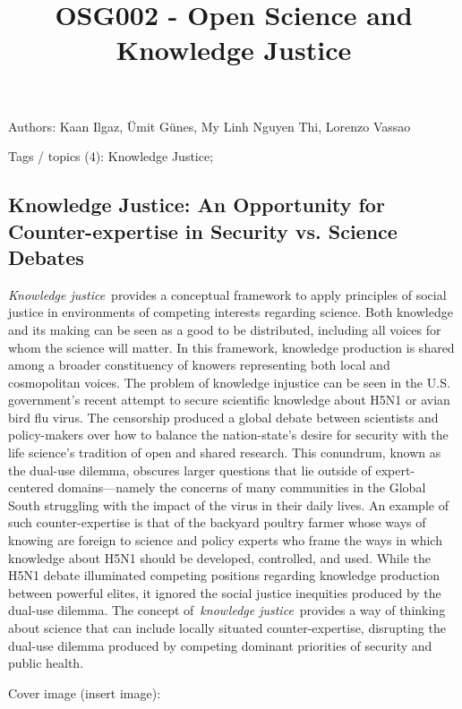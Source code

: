 \documentclass{article}
\begin{document}
\title{OSG002 - Open Science and Knowledge Justice}

\maketitle


Authors: Kaan Ilgaz, Ümit Günes, My Linh Nguyen Thi, Lorenzo Vassao


Tags / topics (4): Knowledge Justice; 


\subsection{\textbf{Knowledge Justice: An Opportunity for Counter-expertise in Security vs. Science Debates}}\label{H7151279}



\emph{Knowledge justice} provides a conceptual framework to apply principles of social justice in environments of competing interests regarding science. Both knowledge and its making can be seen as a good to be distributed, including all voices for whom the science will matter. In this framework, knowledge production is shared among a broader constituency of knowers representing both local and cosmopolitan voices. The problem of knowledge injustice can be seen in the U.S. government’s recent attempt to secure scientific knowledge about H5N1 or avian bird flu virus. The censorship produced a global debate between scientists and policy-makers over how to balance the nation-state’s desire for security with the life science’s tradition of open and shared research. This conundrum, known as the dual-use dilemma, obscures larger questions that lie outside of expert-centered domains—namely the concerns of many communities in the Global South struggling with the impact of the virus in their daily lives. An example of such counter-expertise is that of the backyard poultry farmer whose ways of knowing are foreign to science and policy experts who frame the ways in which knowledge about H5N1 should be developed, controlled, and used. While the H5N1 debate illuminated competing positions regarding knowledge production between powerful elites, it ignored the social justice inequities produced by the dual-use dilemma. The concept of \emph{knowledge justice} provides a way of thinking about science that can include locally situated counter-expertise, disrupting the dual-use dilemma produced by competing dominant priorities of security and public health.


Cover image (insert image): 
\end{document}
